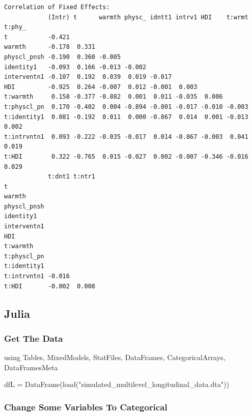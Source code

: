 \documentclass[
  letterpaper,
  DIV=11,
  numbers=noendperiod]{scrreprt}
\newenvironment{Shaded}{\begin{snugshade}}{\end{snugshade}}
\newcommand{\BuiltInTok}[1]{\textcolor[rgb]{0.00,0.23,0.31}{#1}}
\newcommand{\FunctionTok}[1]{\textcolor[rgb]{0.28,0.35,0.67}{#1}}
\newcommand{\ImportTok}[1]{\textcolor[rgb]{0.00,0.46,0.62}{#1}}
\newcommand{\NormalTok}[1]{\textcolor[rgb]{0.00,0.23,0.31}{#1}}
\newcommand{\OperatorTok}[1]{\textcolor[rgb]{0.37,0.37,0.37}{#1}}
\newcommand{\StringTok}[1]{\textcolor[rgb]{0.13,0.47,0.30}{#1}}
\begin{document}
\begin{verbatim}
Correlation of Fixed Effects:
            (Intr) t      warmth physc_ idntt1 intrv1 HDI    t:wrmt t:phy_
t           -0.421                                                        
warmth      -0.178  0.331                                                 
physcl_pnsh -0.190  0.360 -0.005                                          
identity1   -0.093  0.166 -0.013 -0.002                                   
interventn1 -0.107  0.192  0.039  0.019 -0.017                            
HDI         -0.925  0.264 -0.007  0.012 -0.001  0.003                     
t:warmth     0.158 -0.377 -0.882  0.001  0.011 -0.035  0.006              
t:physcl_pn  0.170 -0.402  0.004 -0.894 -0.001 -0.017 -0.010 -0.003       
t:identity1  0.081 -0.192  0.011  0.000 -0.867  0.014  0.001 -0.013  0.002
t:intrvntn1  0.093 -0.222 -0.035 -0.017  0.014 -0.867 -0.003  0.041  0.019
t:HDI        0.322 -0.765  0.015 -0.027  0.002 -0.007 -0.346 -0.016  0.029
            t:dnt1 t:ntr1
t                        
warmth                   
physcl_pnsh              
identity1                
interventn1              
HDI                      
t:warmth                 
t:physcl_pn              
t:identity1              
t:intrvntn1 -0.016       
t:HDI       -0.002  0.008
\end{verbatim}

\subsection{Julia}

\subsubsection{Get The Data}\label{get-the-data-5}

\begin{Shaded}
\begin{Highlighting}[]
\ImportTok{using} \BuiltInTok{Tables}\NormalTok{, }\BuiltInTok{MixedModels}\NormalTok{, }\BuiltInTok{StatFiles}\NormalTok{, }\BuiltInTok{DataFrames}\NormalTok{, }\BuiltInTok{CategoricalArrays}\NormalTok{, }\BuiltInTok{DataFramesMeta}

\NormalTok{dfL }\OperatorTok{=} \FunctionTok{DataFrame}\NormalTok{(}\FunctionTok{load}\NormalTok{(}\StringTok{"simulated\_multilevel\_longitudinal\_data.dta"}\NormalTok{))}
\end{Highlighting}
\end{Shaded}

\subsubsection{Change Some Variables To
Categorical}\label{change-some-variables-to-categorical-3}
\end{document}
